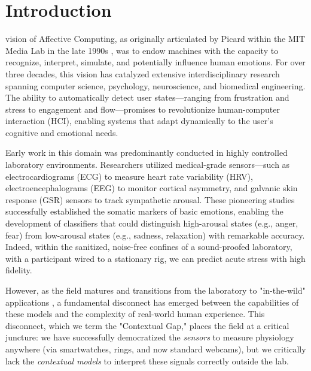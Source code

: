 \documentclass[journal]{IEEEtran}
\begin{document}
\section{Introduction}

 vision of Affective Computing, as originally articulated by Picard within the MIT Media Lab in the late 1990s \cite{picard_affective_computing}, 
was to endow machines with the capacity to recognize, interpret, simulate, and potentially influence human emotions. 
For over three decades, this vision has catalyzed extensive interdisciplinary research spanning computer science, psychology, 
neuroscience, and biomedical engineering. The ability to automatically detect user states—ranging from frustration and stress 
to engagement and flow—promises to revolutionize human-computer interaction (HCI), enabling systems that adapt dynamically 
to the user's cognitive and emotional needs.

Early work in this domain was predominantly conducted in highly controlled laboratory environments. 
Researchers utilized medical-grade sensors—such as electrocardiograms (ECG) to measure heart rate variability (HRV), 
electroencephalograms (EEG) to monitor cortical asymmetry, and galvanic skin response (GSR) sensors to track sympathetic arousal. 
These pioneering studies successfully established the somatic markers of basic emotions, enabling the development of classifiers 
that could distinguish high-arousal states (e.g., anger, fear) from low-arousal states (e.g., sadness, relaxation) with remarkable accuracy. 
Indeed, within the sanitized, noise-free confines of a sound-proofed laboratory, with a participant wired to a stationary rig, 
we can predict acute stress with high fidelity.

However, as the field matures and transitions from the laboratory to "in-the-wild" applications \cite{ambulatory_assessment}, 
a fundamental disconnect has emerged between the capabilities of these models and the complexity of real-world human experience. 
This disconnect, which we term the "Contextual Gap," places the field at a critical juncture: we have successfully democratized 
the \textit{sensors} to measure physiology anywhere (via smartwatches, rings, and now standard webcams), 
but we critically lack the \textit{contextual models} to interpret these signals correctly outside the lab.
\end{document}
